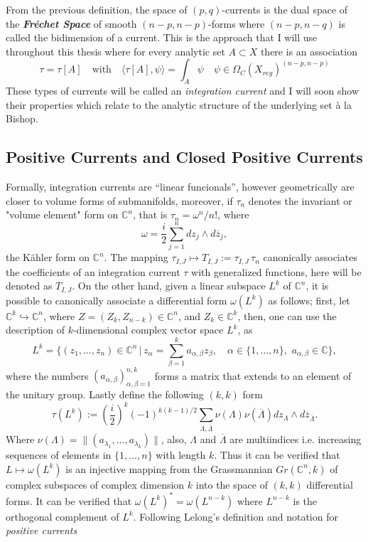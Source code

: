 \documentclass[12pt,twoside,a4paper]{report}
\newcommand{\co}{\ensuremath{\mathbb C }}
\newcommand{\con}{\ensuremath{\mathbb{C}^n}}
\newcommand{\om}{\ensuremath{\Omega}}
\begin{document}
From the previous definition, the space of $(p,q)$-currents is the dual space of the \emph{\bf Fréchet Space} of smooth $(n-p,n-p)$-forms where $(n-p,n-q)$ is called the bidimension of a current. This is the approach that I will use throughout this thesis where for every analytic set $A\subset X$ there is an association
\[
  \tau=\tau[A]\quad\text{with}\quad\langle\tau[A],\psi\rangle=\int_A\psi\quad\psi\in\om_C(X_{reg})^{(n-p,n-p)}
\]
These types of currents will be called an \emph{integration current} and I will soon show their properties which relate to the analytic structure of the underlying set à la Bishop.  
\subsection{Positive Currents and Closed Positive Currents}
\noindent Formally, integration currents are ``linear funcionals'', however geometrically are closer to volume forms of submanifolds, moreover, if $\tau_n$ denotes the invariant or "volume element" form on $\con$, that is $\tau_n=\omega^n/n!$, where
\begin{equation}
    \omega=\frac{i}{2}\sum_{j=1}^n dz_j\wedge d\overline{z}_j,
\end{equation}
the Kähler form on $\mathbb{C}^n$. The mapping $\tau_{I,J}\mapsto T_{I,J}:=\tau_{I,J}\,\tau_n$ canonically associates the coefficients of an integration current $\tau$ with generalized functions, here will be denoted as $T_{I,J}$. On the other hand, given a linear subspace $L^k$ of $\con$, it is possible to canonically associate a differential form $\omega(L^k)$ as follows; first, let $\co^k\hookrightarrow \co^n$, where $Z=(Z_k,Z_{n-k})\in\con$, and $Z_k\in\co^k$, then, one can use the description of $k$-dimensional complex vector space $L^k$, as
\[
    L^k=\{(z_1,\dots,z_n)\in\con\,|\,z_{\alpha}=\sum_{\beta=1}^k a_{\alpha,\beta}z_\beta,\quad \alpha\in\{1,\dots, n\},\,\, a_{\alpha,\beta}\in\co\},
\]
 where the numbers $(a_{\alpha,\beta})_{\alpha,\beta=1}^{n,k}$ forms a matrix that extends to an element of the unitary group. Lastly define the following $(k,k)$ form
\[
    \tau(L^k):=\left(\frac{i}{2}\right)^k(-1)^{k(k-1)/2}\sum_{\Lambda,\overline{\Lambda}} \nu(\Lambda)\nu(\overline{\Lambda})dz_{\Lambda}\wedge d\overline{z}_{\overline{\Lambda}}.
\]
Where $\nu(\Lambda)=\|(a_{\lambda_1},\dots,a_{\lambda_k})\|$, also, $\Lambda$ and $\overline{\Lambda}$ are multiindices i.e. increasing sequences of elements in $\{1,\dots,n\}$ with length $k$. Thus it can be verified that $L\mapsto\omega(L^k)$ is an injective mapping from the Grassmannian $Gr(\con,k)$ of complex subspaces of complex dimension $k$ into the space of $(k,k)$ differential forms. It can be verified that $\omega(L^k)^{*}=\omega(L^{n-k})$ where $L^{n-k}$ is the orthogonal complement of $L^k$. Following Lelong's definition and notation for \emph{positive currents}
\end{document}
